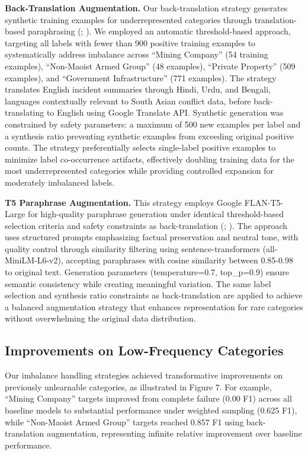 \documentclass[
  11pt,
]{article}
\begin{document}
\textbf{Back-Translation Augmentation.} Our back-translation strategy
generates synthetic training examples for underrepresented categories
through translation-based paraphrasing
(;
). We employed an automatic
threshold-based approach, targeting all labels with fewer than 900
positive training examples to systematically address imbalance across
``Mining Company'' (54 training examples), ``Non-Maoist Armed Group''
(48 examples), ``Private Property'' (509 examples), and ``Government
Infrastructure'' (771 examples). The strategy translates English
incident summaries through Hindi, Urdu, and Bengali, languages
contextually relevant to South Asian conflict data, before
back-translating to English using Google Translate API. Synthetic
generation was constrained by safety parameters: a maximum of 500 new
examples per label and a synthesis ratio preventing synthetic examples
from exceeding original positive counts. The strategy preferentially
selects single-label positive examples to minimize label co-occurrence
artifacts, effectively doubling training data for the most
underrepresented categories while providing controlled expansion for
moderately imbalanced labels.

\textbf{T5 Paraphrase Augmentation.} This strategy employs Google
FLAN-T5-Large for high-quality paraphrase generation under identical
threshold-based selection criteria and safety constraints as
back-translation (;
). The approach uses
structured prompts emphasizing factual preservation and neutral tone,
with quality control through similarity filtering using
sentence-transformers (all-MiniLM-L6-v2), accepting paraphrases with
cosine similarity between 0.85-0.98 to original text. Generation
parameters (temperature=0.7, top\_p=0.9) ensure semantic consistency
while creating meaningful variation. The same label selection and
synthesis ratio constraints as back-translation are applied to achieve a
balanced augmentation strategy that enhances representation for rare
categories without overwhelming the original data distribution.

\subsection{Improvements on Low-Frequency
Categories}\label{improvements-on-low-frequency-categories}

Our imbalance handling strategies achieved transformative improvements
on previously unlearnable categories, as illustrated in Figure 7. For
example, ``Mining Company'' targets improved from complete failure (0.00
F1) across all baseline models to substantial performance under weighted
sampling (0.625 F1), while ``Non-Maoist Armed Group'' targets reached
0.857 F1 using back-translation augmentation, representing infinite
relative improvement over baseline performance.
\end{document}
